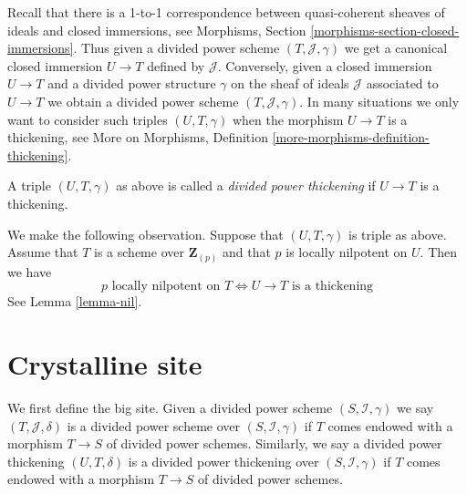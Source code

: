 \noindent
Recall that there is a 1-to-1 correspondence between quasi-coherent
sheaves of ideals and closed immersions, see
Morphisms, Section \ref{morphisms-section-closed-immersions}.
Thus given a divided power scheme $(T, \mathcal{J}, \gamma)$ we
get a canonical closed immersion $U \to T$ defined by $\mathcal{J}$.
Conversely, given a closed immersion $U \to T$ and a divided power
structure $\gamma$ on the sheaf of ideals $\mathcal{J}$ associated
to $U \to T$ we obtain a divided power scheme $(T, \mathcal{J}, \gamma)$.
In many situations we only want to consider such triples
$(U, T, \gamma)$ when the morphism $U \to T$ is a thickening, see
More on Morphisms, Definition \ref{more-morphisms-definition-thickening}.

\begin{definition}
\label{definition-divided-power-thickening}
A triple $(U, T, \gamma)$ as above is called a {\it divided power thickening}
if $U \to T$ is a thickening.
\end{definition}

\noindent
We make the following observation. Suppose that $(U, T, \gamma)$
is triple as above. Assume that $T$ is a scheme over $\mathbf{Z}_{(p)}$
and that $p$ is locally nilpotent on $U$. Then we have
$$
p\text{ locally nilpotent on }T
\Leftrightarrow
U \to T\text{ is a thickening}
$$
See Lemma \ref{lemma-nil}.





\section{Crystalline site}
\label{section-site}

\noindent
We first define the big site. Given a divided power scheme
$(S, \mathcal{I}, \gamma)$ we say $(T, \mathcal{J}, \delta)$ is
a divided power scheme over $(S, \mathcal{I}, \gamma)$ if
$T$ comes endowed with a morphism $T \to S$ of divided power
schemes. Similarly, we say a divided power thickening $(U, T, \delta)$
is a divided power thickening over $(S, \mathcal{I}, \gamma)$
if $T$ comes endowed with a morphism $T \to S$ of divided power
schemes.

